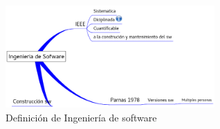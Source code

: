 
\begin{figure}[h!] \centering
\includegraphics[angle=0,width=80mm]{capitulo1/definicion_isw_hrb.png} 
\caption{Definici\'on de Ingenier\'ia de software}
\label{figuragoogle}
\end{figure}
